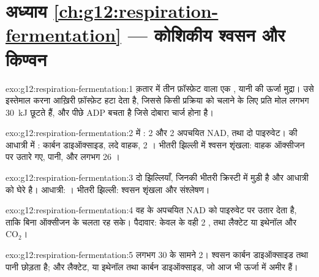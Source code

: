 \section*{अध्याय \ref{ch:g12:respiration-fermentation} --- कोशिकीय श्वसन और किण्वन}

\begin{solution}{exo:g12:respiration-fermentation:1}
क़तार में तीन फ़ॉस्फ़ेट वाला एक , यानी  की ऊर्जा मुद्रा।
उसे इस्तेमाल करना आख़िरी फ़ॉस्फ़ेट हटा देता है, जिससे किसी प्रक्रिया को
चलाने के लिए प्रति मोल लगभग \qty{30}{kJ} छूटते हैं, और पीछे ADP बचता है जिसे
दोबारा चार्ज होना है।
\end{solution}

\begin{solution}{exo:g12:respiration-fermentation:2}
 में : 2  और 2 अपचयित NAD, तथा दो पाइरुवेट।
 की आधात्री में : कार्बन डाइऑक्साइड, लदे वाहक, 2 ।
भीतरी झिल्ली में श्वसन शृंखला: वाहक ऑक्सीजन पर उतारे गए, पानी, और लगभग 26
।
\end{solution}

\begin{solution}{exo:g12:respiration-fermentation:3}
दो झिल्लियाँ, जिनकी भीतरी क्रिस्टी में मुड़ी है और आधात्री को घेरे है।
आधात्री: । भीतरी झिल्ली: श्वसन शृंखला और  संश्लेषण।
\end{solution}

\begin{solution}{exo:g12:respiration-fermentation:4}
वह  के अपचयित NAD को पाइरुवेट पर उतार देता है, ताकि
 बिना ऑक्सीजन के चलता रह सके। पैदावार: केवल  के वही
2 , तथा लैक्टेट या इथेनॉल और $\mathrm{CO_2}$।
\end{solution}

\begin{solution}{exo:g12:respiration-fermentation:5}
लगभग 30  के सामने 2। श्वसन कार्बन डाइऑक्साइड तथा पानी छोड़ता है; और
 लैक्टेट, या इथेनॉल तथा कार्बन डाइऑक्साइड, जो आज भी ऊर्जा में अमीर
हैं।
\end{solution}

